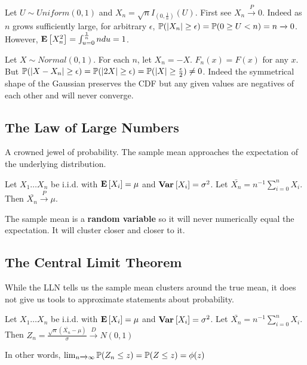 \documentclass[10pt]{article}
\begin{document}
\begin{note}
    Let $U \sim Uniform(0, 1)$ and $X_n = \sqrt{n}I_{(0, \frac{1}{n})}(U)$.
    First see $X_n \xrightarrow{P} 0$. Indeed as $n$ grows sufficiently large, for
    arbitrary $\epsilon$, $\P(|X_n| \geq \epsilon) = \P(0 \geq U < n) = n
    \xrightarrow{} 0$. However, $\E{X_n^2} = \int_{u=0}^{\frac{1}{n}} n du =
    1$.
\end{note}

\begin{note}
    Let $X \sim Normal(0, 1)$. For each $n$, let $X_n = -X$. $F_n(x) = F(x)$
    for any $x$. But $\P(|X - X_n| \geq \epsilon) = \P(|2X| \geq \epsilon) = \P(|X|
    \geq \frac{\epsilon}{2}) \neq 0$.  Indeed the symmetrical shape of the
    Gaussian preserves the CDF but any given values are negatives of each other
    and will never converge.
\end{note}

\subsection{The Law of Large Numbers}

A crowned jewel of probability. The sample mean approaches the expectation of
the underlying distribution.

\begin{definition}
    Let $X_1 \dots X_n$ be i.i.d. with $\E{X_i} = \mu$ and $\Var{X_i} =
    \sigma^2$. Let $\bar{X_n} = n^{-1}\sum_{i=0}^n X_i$. Then $\bar{X_n}
    \xrightarrow{P} \mu$.
\end{definition}

The sample mean is a \textbf{random variable} so it will never numerically
equal the expectation. It will cluster closer and closer to it.

\subsection{The Central Limit Theorem}

While the LLN tells us the sample mean clusters around the true mean, it does
not give us tools to approximate statements about probability.

\begin{definition}[CLT]
    Let $X_1 \dots X_n$ be i.i.d. with $\E{X_i} = \mu$ and $\Var{X_i} =
    \sigma^2$. Let $\bar{X_n} = n^{-1}\sum_{i=0}^n X_i$. Then $Z_n =
    \frac{\sqrt{n}(\bar{X_n}-\mu)}{\sigma} \xrightarrow{D} N(0, 1)$

    In other words, $\lim_{n \xrightarrow{} \infty} \P(Z_n \leq z) = \P(Z \leq z) = \phi(z)$
\end{definition}
\end{document}

